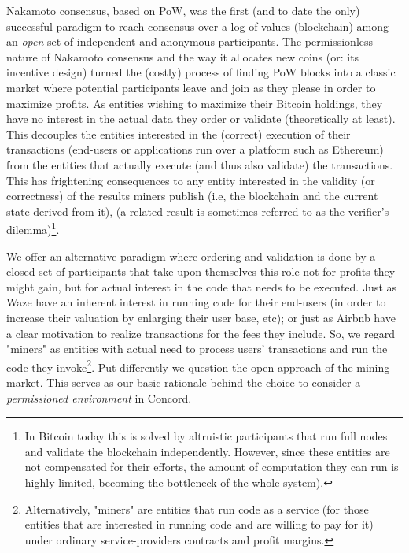 

Nakamoto consensus, based on PoW, was the first (and to date the only) successful paradigm to reach consensus over a log of values (blockchain) among an \emph{open} set of independent and anonymous participants. The permissionless nature of Nakamoto consensus and the way it allocates new coins (or: its incentive design) turned the (costly) process of finding PoW blocks into a classic market where potential participants leave and join as they please in order to maximize profits. As entities wishing to maximize their Bitcoin holdings, they have no interest in the actual data they order or validate (theoretically at least). This decouples the entities interested in the (correct) execution of their transactions (end-users or applications run over a platform such as Ethereum) from the entities that actually execute (and thus also validate) the transactions. This has frightening consequences to any entity interested in the validity (or correctness) of the results miners publish (i.e, the blockchain and the current state derived from it), (a related result is sometimes referred to as the verifier's dilemma)\footnote{In Bitcoin today this is solved by altruistic participants that run full nodes and validate the blockchain independently. However, since these entities are not compensated for their efforts, the amount of computation they can run is highly limited, becoming the bottleneck of the whole system).}. 

We offer an alternative paradigm where ordering and validation is done by a closed set of participants that take upon themselves this role not for profits they might gain, but for actual interest in the code that needs to be executed. Just as Waze have an inherent interest in running code for their end-users (in order to increase their valuation by enlarging their user base, etc); or just as Airbnb have a clear motivation to realize transactions for the fees they include. So, we regard "miners" as entities with actual need to process users' transactions and run the code they invoke\footnote{Alternatively, "miners" are entities that run code as a service (for those entities that are interested in running code and are willing to pay for it) under ordinary service-providers contracts and profit margins.}. Put differently we question the open approach of the mining market. This serves as our basic rationale behind the choice to consider a \emph{permissioned environment} in Concord.

